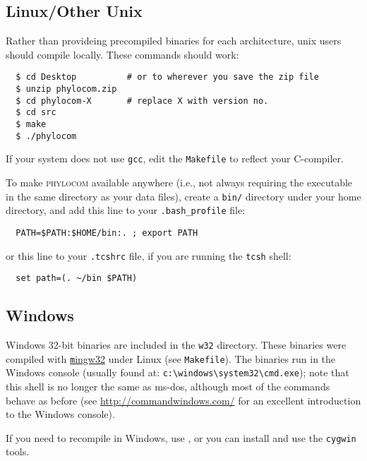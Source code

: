 \documentclass[12pt,letterpaper]{article}
\begin{document}
\subsection{Linux/Other Unix}

Rather than provideing precompiled binaries for each architecture,
unix users should compile locally.  These commands should work:
\begin{verbatim}
  $ cd Desktop          # or to wherever you save the zip file
  $ unzip phylocom.zip
  $ cd phylocom-X       # replace X with version no.
  $ cd src
  $ make
  $ ./phylocom
\end{verbatim}
If your system does not use \verb|gcc|, edit the \verb|Makefile| to
reflect your C-compiler.


To make {\scshape phylocom} available anywhere (i.e., not always
requiring the executable in the same directory as your data files),
create a \verb|bin/| directory under your home directory, and add this
line to your \verb|.bash_profile| file:
\begin{verbatim}
  PATH=$PATH:$HOME/bin:. ; export PATH
\end{verbatim}
or this line to your \verb|.tcshrc| file, if you are running the
\verb|tcsh| shell:
\begin{verbatim}
  set path=(. ~/bin $PATH)
\end{verbatim}

\subsection{Windows}

Windows 32-bit binaries are included in the \texttt{w32}
directory. These binaries were compiled with
\href{http://www.mingw32.org/}{\texttt mingw32} under
Linux (see \verb|Makefile|).  The binaries run in the Windows console
(usually found at: \verb|c:\windows\system32\cmd.exe|); note that this
shell is no longer the same as {\sc ms-dos}, although most of the
commands behave as before (see
\href{http://commandwindows.com/}{http://commandwindows.com/}
for an excellent introduction to the Windows console).

If you need to recompile in Windows, use
, or you
can install and use the \verb|cygwin| tools.
\end{document}
